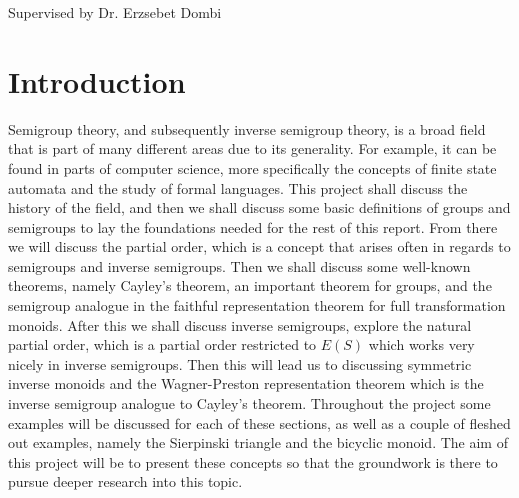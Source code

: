 \documentclass[12pt]{article}
\begin{document}
\vspace*{5cm}
Supervised by Dr. Erzsebet Dombi 
\newpage
\normalsize
\tableofcontents
\newpage
\section{Introduction}
Semigroup theory, and subsequently inverse semigroup theory, is a broad field that is part of many different areas due to its generality. For example, it can be found in parts of computer science, more specifically the concepts of finite state automata and the study of formal languages\cite{1}. This project shall discuss the history of the field, and then we shall discuss some basic definitions of groups and semigroups to lay the foundations needed for the rest of this report. From there we will discuss the partial order, which is a concept that arises often in regards to semigroups and inverse semigroups. Then we shall discuss some well-known theorems, namely Cayley's theorem, an important theorem for groups, and the semigroup analogue in the faithful representation theorem for full transformation monoids. After this we shall discuss inverse semigroups, explore the natural partial order, which is a partial order restricted to $E(S)$ which works very nicely in inverse semigroups. Then this will lead us to discussing symmetric inverse monoids and the Wagner-Preston representation theorem which is the inverse semigroup analogue to Cayley's theorem. Throughout the project some examples will be discussed for each of these sections, as well as a couple of fleshed out examples, namely the Sierpinski triangle and the bicyclic monoid. The aim of this project will be to present these concepts so that the groundwork is there to pursue deeper research into this topic.
\end{document}
